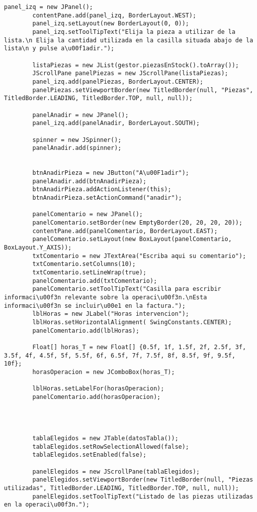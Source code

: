 \begin{lstlisting}[caption=VentanaReparacion.java (App Escritorio)]
		panel_izq = new JPanel();
		contentPane.add(panel_izq, BorderLayout.WEST);
		panel_izq.setLayout(new BorderLayout(0, 0));
		panel_izq.setToolTipText("Elija la pieza a utilizar de la lista.\n Elija la cantidad utilizada en la casilla situada abajo de la lista\n y pulse a\u00f1adir.");
		
		listaPiezas = new JList(gestor.piezasEnStock().toArray());
		JScrollPane panelPiezas = new JScrollPane(listaPiezas);
		panel_izq.add(panelPiezas, BorderLayout.CENTER);
		panelPiezas.setViewportBorder(new TitledBorder(null, "Piezas", TitledBorder.LEADING, TitledBorder.TOP, null, null));
				
		panelAnadir = new JPanel();
		panel_izq.add(panelAnadir, BorderLayout.SOUTH);
		
		spinner = new JSpinner();
		panelAnadir.add(spinner);
		
		
		btnAnadirPieza = new JButton("A\u00F1adir");
		panelAnadir.add(btnAnadirPieza);
		btnAnadirPieza.addActionListener(this);
		btnAnadirPieza.setActionCommand("anadir");
		
		panelComentario = new JPanel();
		panelComentario.setBorder(new EmptyBorder(20, 20, 20, 20));
		contentPane.add(panelComentario, BorderLayout.EAST);
		panelComentario.setLayout(new BoxLayout(panelComentario, BoxLayout.Y_AXIS));
		txtComentario = new JTextArea("Escriba aqui su comentario");
		txtComentario.setColumns(10);
		txtComentario.setLineWrap(true);
		panelComentario.add(txtComentario);
		panelComentario.setToolTipText("Casilla para escribir informaci\u00f3n relevante sobre la operaci\u00f3n.\nEsta informaci\u00f3n se incluir\u00e1 en la factura.");
		lblHoras = new JLabel("Horas intervencion");
		lblHoras.setHorizontalAlignment( SwingConstants.CENTER);
		panelComentario.add(lblHoras);
		
		Float[] horas_T = new Float[] {0.5f, 1f, 1.5f, 2f, 2.5f, 3f, 3.5f, 4f, 4.5f, 5f, 5.5f, 6f, 6.5f, 7f, 7.5f, 8f, 8.5f, 9f, 9.5f, 10f};
		horasOperacion = new JComboBox(horas_T);
		
		lblHoras.setLabelFor(horasOperacion);
		panelComentario.add(horasOperacion);
		
		
		
		
		tablaElegidos = new JTable(datosTabla());
		tablaElegidos.setRowSelectionAllowed(false);
		tablaElegidos.setEnabled(false);
		
		panelElegidos = new JScrollPane(tablaElegidos);
		panelElegidos.setViewportBorder(new TitledBorder(null, "Piezas utilizadas", TitledBorder.LEADING, TitledBorder.TOP, null, null));
		panelElegidos.setToolTipText("Listado de las piezas utilizadas en la operaci\u00f3n.");


\end{lstlisting}
